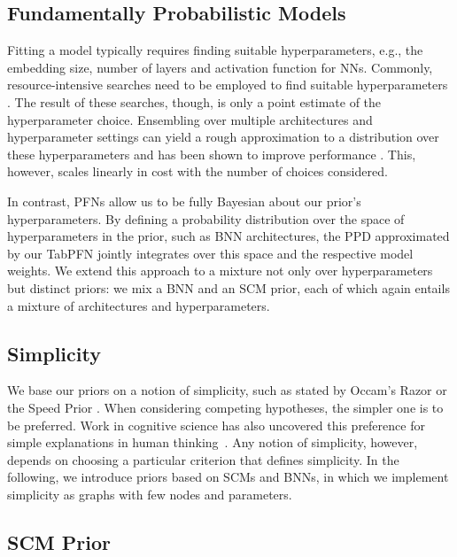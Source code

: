 \subsection{Fundamentally Probabilistic Models}
\label{sec:probabilistic prior} Fitting a model typically requires finding suitable hyperparameters, e.g., the embedding size, number of layers and activation function for NNs. Commonly, resource-intensive searches need to be employed to find suitable hyperparameters \citep{zoph-iclr17a,feurer-automlbook19a}. The result of these searches, though, is only a point estimate of the hyperparameter choice. Ensembling over multiple architectures and hyperparameter settings can yield a rough approximation to a distribution over these hyperparameters and has been shown to improve performance \citep{zaidi-neurips21a,hyperensemble}. This, however, scales linearly in cost with the number of choices considered.

In contrast, PFNs allow us to be fully Bayesian about our prior's hyperparameters. By defining a probability distribution over the space of hyperparameters in the prior, such as BNN architectures, the PPD approximated by our TabPFN jointly integrates over this space and the respective model weights. We extend this approach to a mixture not only over hyperparameters but distinct priors: we mix a BNN and an SCM prior, each of which again entails a mixture of architectures and hyperparameters.

\subsection{Simplicity}
\label{sec:modelling simplicity assumptions} We base our priors on a notion of simplicity, such as stated by Occam's Razor or the Speed Prior \citep{speedprior}. When considering competing hypotheses, the simpler one is to be preferred. Work in cognitive science has also uncovered this preference for simple explanations in human thinking~\citep{explanatoryvalues}. Any notion of simplicity, however, depends on choosing a particular criterion that defines simplicity. In the following, we introduce priors based on SCMs and BNNs, in which we implement simplicity as graphs with few nodes and parameters. 
\subsection{SCM Prior}

\label{sec:causal prior}

